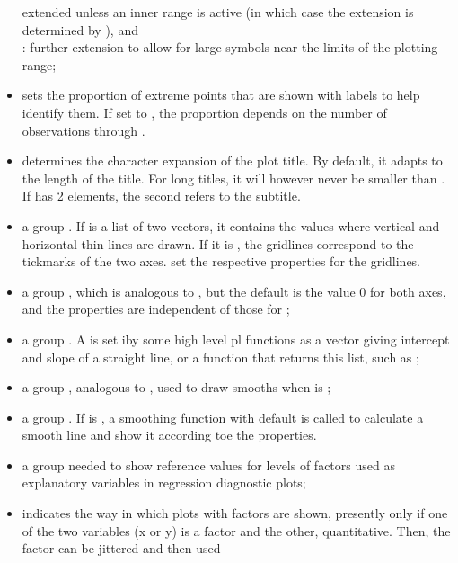 \documentclass[11pt]{article}\usepackage[]{graphicx}\usepackage[]{color}
\begin{document}
\begin{itemize}
  extended unless an inner range is active (in which case the extension 
  is determined by ), and\\
  : further extension to allow for large symbols near the 
  limits of the plotting range;
\item
   sets the proportion of extreme points that are shown 
  with labels to help identify them.
  If set to , the proportion depends on the number  of
  observations through .
\item
   determines the character expansion of the plot title.
  By default, it adapts to the length of the title.
  For long titles, it will however never be smaller than
  . 
  If  has 2 elements, the second refers to the subtitle.
\item
  a group . If  is a list of two vectors,
  it contains the values where vertical and horizontal thin lines are drawn.
  If it is , the gridlines correspond to the tickmarks of the
  two axes.
   set the respective
  properties for the gridlines.
\item
  a group , which is analogous to , but the
  default is the value 0 for both axes, and the properties are independent
  of those for ;
\item
  a group . A  is set iby some high level 
  pl functions as a vector giving intercept and slope of a straight line, 
  or a function that returns this list, such as ;
\item
  a group , analogous to , used to draw smooths
  when  is ;
\item
  a group . If  is , a smoothing function 
  with default \Hneed{80mm}  
  is called to calculate a
  smooth line and show it according toe the  properties.
\item
  a group  needed to show reference values for levels of factors
  used as explanatory variables in regression diagnostic plots;
\item
   indicates the way in which plots with factors are shown,
  presently only if one of the two variables (x or y) is a factor and the
  other, quantitative. Then, the factor can be jittered and then used

\end{itemize}
\end{document}
